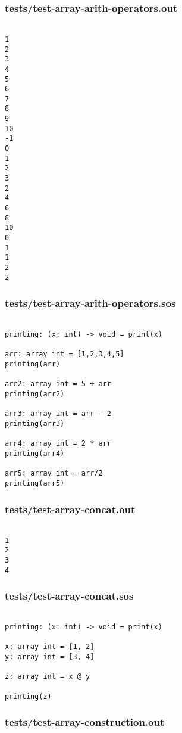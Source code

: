 \documentclass[main.tex]{subfiles}
\begin{document}
\subsubsection{tests/test-array-arith-operators.out}

\begin{lstlisting}

1
2
3
4
5
6
7
8
9
10
-1
0
1
2
3
2
4
6
8
10
0
1
1
2
2
\end{lstlisting}

\subsubsection{tests/test-array-arith-operators.sos}

\begin{lstlisting}

printing: (x: int) -> void = print(x)

arr: array int = [1,2,3,4,5]
printing(arr)

arr2: array int = 5 + arr
printing(arr2)

arr3: array int = arr - 2
printing(arr3)

arr4: array int = 2 * arr
printing(arr4)

arr5: array int = arr/2
printing(arr5)
\end{lstlisting}

\subsubsection{tests/test-array-concat.out}

\begin{lstlisting}

1
2
3
4
\end{lstlisting}

\subsubsection{tests/test-array-concat.sos}

\begin{lstlisting}

printing: (x: int) -> void = print(x)

x: array int = [1, 2]
y: array int = [3, 4]

z: array int = x @ y

printing(z)
\end{lstlisting}

\subsubsection{tests/test-array-construction.out}
\end{document}
